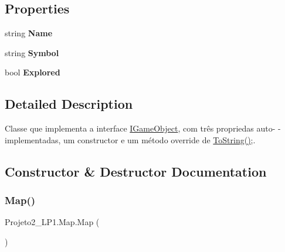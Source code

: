 \subsection*{Properties}
\begin{DoxyCompactItemize}
\item 
\mbox{\label{class_projeto2___l_p1_1_1_map_a47d2cef0bebe98b8f11cc18bdeb83222}} 
string {\bfseries Name}
\item 
\mbox{\label{class_projeto2___l_p1_1_1_map_a53d8b7cfa6127e9b930633ac097fa73c}} 
string {\bfseries Symbol}
\item 
\mbox{\label{class_projeto2___l_p1_1_1_map_a305dfea449e9fbc617bdc8c12d8b1a34}} 
bool {\bfseries Explored}
\end{DoxyCompactItemize}


\subsection{Detailed Description}
Classe que implementa a interface \mbox{\hyperlink{interface_projeto2___l_p1_1_1_i_game_object}{I\+Game\+Object}}, com três propriedas auto-\/ -\/implementadas, um constructor e um método override de \mbox{\hyperlink{class_projeto2___l_p1_1_1_map_a4693bc7aa33a5c2c98d99dcd5dc1f524}{To\+String()}};. 



\subsection{Constructor \& Destructor Documentation}
\mbox{\label{class_projeto2___l_p1_1_1_map_a8ae219bdbad54518c568b3a77e97b6bf}} 
\subsubsection{\texorpdfstring{Map()}{Map()}}
{\footnotesize\ttfamily Projeto2\+\_\+\+L\+P1.\+Map.\+Map (\begin{DoxyParamCaption}{ }\end{DoxyParamCaption})\hspace{0.3cm}{\ttfamily [inline]}}



